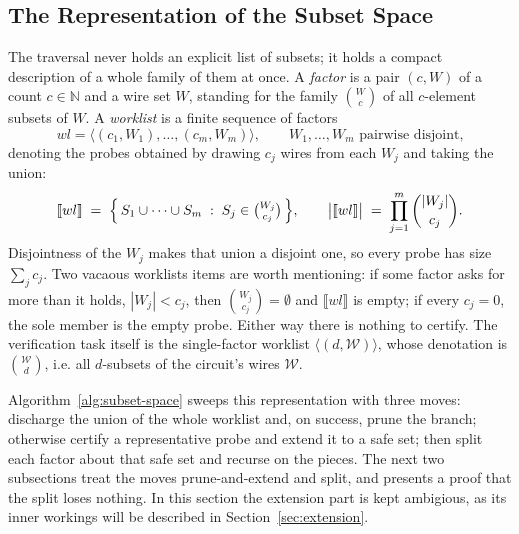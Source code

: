   \subsection{The Representation of the Subset Space}
  \label{sec:represent-subsets}

  The traversal never holds an explicit list of subsets; it holds a compact
  description of a whole family of them at once. A \emph{factor} is a pair
  $(c, W)$ of a count $c \in \mathbb{N}$ and a wire set $W$, standing for the
  family $\binom{W}{c}$ of all $c$-element subsets of $W$. A \emph{worklist} is a
  finite sequence of factors
  \[
    wl = \big\langle (c_1, W_1), \dots, (c_m, W_m) \big\rangle,
    \qquad W_1, \dots, W_m \text{ pairwise disjoint,}
  \]
  denoting the probes obtained by drawing $c_j$ wires from each $W_j$ and taking
  the union:
  \[
    \llbracket wl \rrbracket \;=\;
      \Big\{\, S_1 \cup \dots \cup S_m \;:\; S_j \in \tbinom{W_j}{c_j} \,\Big\},
    \qquad
    \big|\llbracket wl \rrbracket\big| \;=\; \prod_{j=1}^{m} \binom{|W_j|}{c_j}.
  \]
  Disjointness of the $W_j$ makes that union a disjoint one, so every probe has
  size $\sum_j c_j$. Two vacaous worklists items are
  worth mentioning: if some factor asks for more than it holds, $|W_j| < c_j$, then
  $\binom{W_j}{c_j} = \emptyset$ and $\llbracket wl \rrbracket$ is empty; if every
  $c_j = 0$, the sole member is the empty probe. Either way there is nothing to
  certify. The verification task itself is the single-factor worklist
  $\big\langle (d, \mathcal{W}) \big\rangle$, whose denotation is
  $\binom{\mathcal{W}}{d}$, i.e. all $d$-subsets of the circuit's wires
  $\mathcal{W}$.

  Algorithm~\ref{alg:subset-space} sweeps this representation with three moves:
  discharge the union of the whole worklist and, on success, prune the branch;
  otherwise certify a representative probe and extend it to a safe set; then split
  each factor about that safe set and recurse on the pieces. The next two
  subsections treat the moves prune-and-extend and split, and presents a proof
  that the split loses nothing. In this section the extension part is kept ambigious,
  as its inner workings will be described in Section~\ref{sec:extension}.


